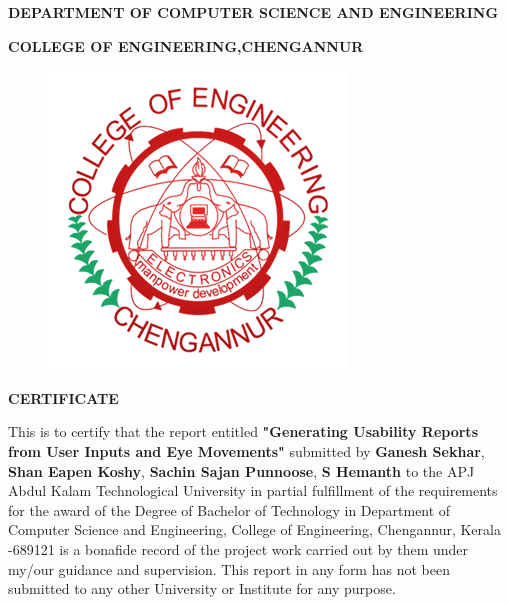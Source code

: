 \documentclass[12pt,a4paper,final]{extreport}
\begin{document}
\begin{center}\fontsize{14}{17} \selectfont \textbf{DEPARTMENT OF COMPUTER SCIENCE AND ENGINEERING}\end{center}
\begin{center}\fontsize{14}{17} \selectfont \textbf{COLLEGE OF ENGINEERING,CHENGANNUR}\end{center}
\begin{figure}[h]
	\begin{center}
		\includegraphics[scale=.33]{ceclogo.png}
		\vspace{.1 cm}
	\end{center}
\end{figure}

\begin{center}\fontsize{14}{17} \selectfont \textbf{CERTIFICATE}\end{center}
This is to certify that the report entitled \textbf{{\large "Generating Usability Reports from User Inputs and Eye Movements"}} submitted by \textbf{Ganesh Sekhar}, \textbf{Shan Eapen Koshy}, \textbf{Sachin Sajan Punnoose}, \textbf{S Hemanth} to the APJ Abdul Kalam Technological University in partial fulfillment of the requirements for the award of the Degree of Bachelor of Technology in Department of Computer Science and Engineering, College of Engineering, Chengannur, Kerala -689121 is a bonafide record of the project work carried out by them under my/our guidance and supervision. This report in any form has not been submitted to any other University or Institute for any purpose.
\end{document}

